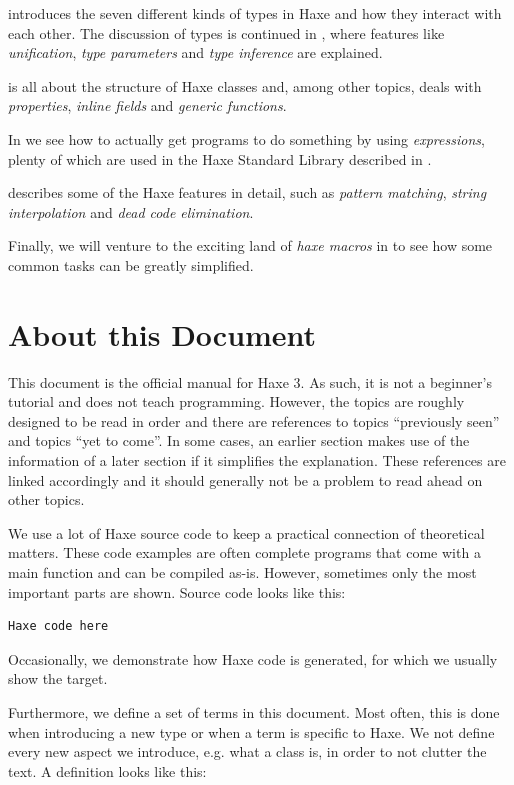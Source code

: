 \documentclass{haxe}
\begin{document}
 introduces the seven different kinds of types in Haxe and how they interact with each other. The discussion of types is continued in , where features like \emph{unification}, \emph{type parameters} and \emph{type inference} are explained.

 is all about the structure of Haxe classes and, among other topics, deals with \emph{properties}, \emph{inline fields} and \emph{generic functions}.

In  we see how to actually get programs to do something by using \emph{expressions}, plenty of which are used in the Haxe Standard Library described in .

 describes some of the Haxe features in detail, such as \emph{pattern matching}, \emph{string interpolation} and \emph{dead code elimination}.

Finally, we will venture to the exciting land of \emph{haxe macros} in  to see how some common tasks can be greatly simplified.


\section{About this Document}
\label{introduction-about-this-document}

This document is the official manual for Haxe 3. As such, it is not a beginner's tutorial and does not teach programming. However, the topics are roughly designed to be read in order and there are references to topics ``previously seen'' and topics ``yet to come''. In some cases, an earlier section makes use of the information of a later section if it simplifies the explanation. These references are linked accordingly and it should generally not be a problem to read ahead on other topics.

We use a lot of Haxe source code to keep a practical connection of theoretical matters. These code examples are often complete programs that come with a main function and can be compiled as-is. However, sometimes only the most important parts are shown.
Source code looks like this:

\begin{lstlisting}
Haxe code here
\end{lstlisting}
Occasionally, we demonstrate how Haxe code is generated, for which we usually show the  target.

Furthermore, we define a set of terms in this document. Most often, this is done when introducing a new type or when a term is specific to Haxe. We not define every new aspect we introduce, e.g. what a class is, in order to not clutter the text. A definition looks like this:
\end{document}

